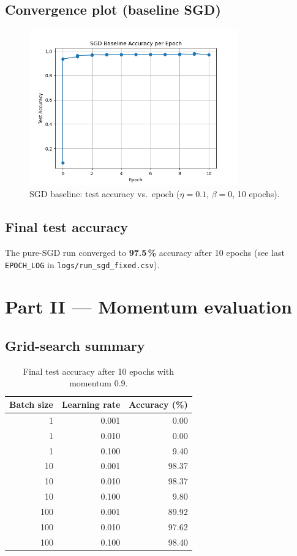 \documentclass[11pt]{article}
\begin{document}
\subsection{Convergence plot (baseline SGD)}
\begin{figure}[H]
  \centering
  \includegraphics[width=0.8\textwidth]{../figures/sgd_baseline.png}
  \caption{SGD baseline: test accuracy vs.\ epoch ($\eta=0.1$, $\beta=0$,
           10 epochs).}
\end{figure}

\subsection{Final test accuracy}
The pure-SGD run converged to \textbf{97.5\,\%} accuracy after 10 epochs (see
last \texttt{EPOCH\_LOG} in \texttt{logs/run\_sgd\_fixed.csv}).

\section{Part II — Momentum evaluation}

\subsection{Grid-search summary}
\begin{table}[H]
  \centering
  \caption{Final test accuracy after 10 epochs with momentum $0.9$.}
  \label{tab:momgrid}
  \begin{tabular}{rrr}
    \toprule
    \textbf{Batch size} & \textbf{Learning rate} & \textbf{Accuracy (\%)}\\
    \midrule
      1  & 0.001 &  0.00\\
      1  & 0.010 &  0.00\\
      1  & 0.100 &  9.40\\
     10  & 0.001 & 98.37\\
     10  & 0.010 & 98.37\\
     10  & 0.100 &  9.80\\
    100  & 0.001 & 89.92\\
    100  & 0.010 & 97.62\\
    100  & 0.100 & 98.40\\
    \bottomrule
  \end{tabular}
\end{table}
\end{document}
